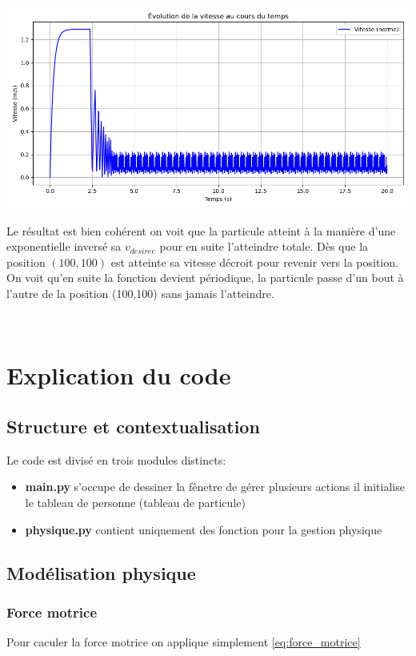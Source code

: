 \documentclass[a4paper,12pt]{article}
\begin{document}
\includegraphics[width=\textwidth]{graph_vitesse.png} %

Le résultat est bien cohérent on voit que la particule atteint à la manière d'une exponentielle inversé sa $v_{desiree}$ pour en suite l'atteindre totale. Dès que la position $(100,100)$ est atteinte sa vitesse décroit pour revenir vers la position. On voit qu'en suite la fonction devient périodique, la particule passe d'un bout à l'autre de la position (100,100) sans jamais l'atteindre.

\
\section{Explication du code}
\subsection{Structure et contextualisation}
\noindent Le code est divisé en trois modules distincts:
\begin{itemize}
	\item \textbf{main.py} s'occupe de dessiner la fênetre de gérer plusieurs actions il initialise le tableau de personne (tableau de particule)
	
	\item \textbf{physique.py} contient uniquement des fonction pour la gestion physique
\end{itemize}

\subsection{Modélisation physique}
\subsubsection{Force motrice}

Pour caculer la force motrice on applique simplement \eqref{eq:force_motrice}
\end{document}
